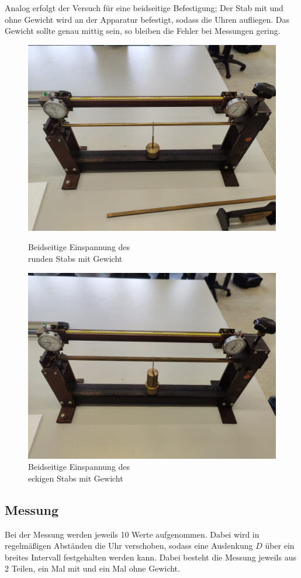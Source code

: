 Analog erfolgt der Versuch für eine beidseitige Befestigung; Der Stab mit und 
ohne Gewicht wird an der Apparatur befestigt, sodass die Uhren aufliegen. Das 
Gewicht sollte genau mittig sein, so bleiben die Fehler bei Messungen gering.
\begin{figure}[h]
    \centering
    \begin{minipage}{0.45\textwidth}
        \centering
        \includegraphics[width=\textwidth]{Bilder/bmG.jpg}
        \caption{Beidseitige Einspannung des \\ runden Stabs mit Gewicht}
    \end{minipage}
    \hfill
    \begin{minipage}{0.45\textwidth}
        \centering
        \includegraphics[width=\textwidth]{Bilder/bmG2.jpg}
        \caption{Beidseitige Einspannung des \\ eckigen Stabs mit Gewicht}
    \end{minipage}
\end{figure}
\subsection{Messung}
Bei der Messung werden jeweils 10 Werte aufgenommen. Dabei wird in regelmäßigen
Abständen die Uhr verschoben, sodass eine Auslenkung $D$ über ein breites 
Intervall festgehalten werden kann. Dabei besteht die Messung jeweils aus 2
Teilen, ein Mal mit und ein Mal ohne Gewicht.
